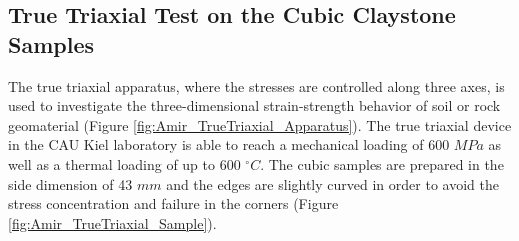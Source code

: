 \subsection{True Triaxial Test on the Cubic Claystone Samples}
\label{sec:True_Triaxial_Exp}
The true triaxial apparatus, where the stresses are controlled along three axes, is used to investigate the three-dimensional strain-strength behavior of soil or rock geomaterial (Figure \ref{fig:Amir_TrueTriaxial_Apparatus}). The true triaxial device in the CAU Kiel laboratory is able to reach a mechanical loading of 600 $MPa$ as well as a thermal loading of up to 600 $^{\circ}C$. The cubic samples are prepared in the side dimension of 43 $mm$ and the edges are slightly curved in order to avoid the stress concentration and failure in the corners (Figure \ref{fig:Amir_TrueTriaxial_Sample}).

